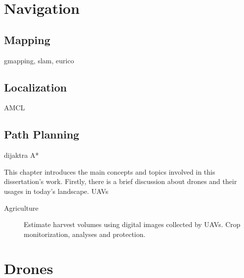 \section {Navigation}
\subsection{Mapping}
gmapping, slam, eurico
\subsection{Localization}
AMCL
\subsection{Path Planning}
dijaktra A*



This chapter introduces the main concepts and topics involved in this dissertation's work. Firstly, there is a brief discussion about drones and their usages in today's landscape. \cite{uavhist} \ac{UAV}s
\begin{description}
    \item[Agriculture] Estimate harvest volumes using digital images collected by \ac{UAV}s\cite{harvest}. Crop monitorization, analyses and protection\cite{crop}\cite{analyses}.  
\end{description}

\section{Drones} 




